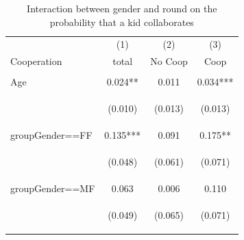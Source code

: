 \documentclass{article} %
\begin{document}
\begin{table}[H]
\caption{Interaction between gender and round on the probability that a kid collaborates } \label{tab:total_round}

\begin{center}
\begin{tabular}{lccc} \hline
 & (1) & (2) & (3) \\
Cooperation & total & No Coop & Coop \\ \hline
\vspace{4pt} & \begin{footnotesize}\end{footnotesize} & \begin{footnotesize}\end{footnotesize} & \begin{footnotesize}\end{footnotesize} \\
Age & 0.024** & 0.011 & 0.034*** \\
\vspace{4pt} & \begin{footnotesize}(0.010)\end{footnotesize} & \begin{footnotesize}(0.013)\end{footnotesize} & \begin{footnotesize}(0.013)\end{footnotesize} \\
groupGender==FF & 0.135*** & 0.091 & 0.175** \\
\vspace{4pt} & \begin{footnotesize}(0.048)\end{footnotesize} & \begin{footnotesize}(0.061)\end{footnotesize} & \begin{footnotesize}(0.071)\end{footnotesize} \\
groupGender==MF & 0.063 & 0.006 & 0.110 \\
\vspace{4pt} & \begin{footnotesize}(0.049)\end{footnotesize} & \begin{footnotesize}(0.065)\end{footnotesize} & \begin{footnotesize}(0.071)\end{footnotesize} \\

\end{tabular}
\end{center}
\end{table}
\end{document}
